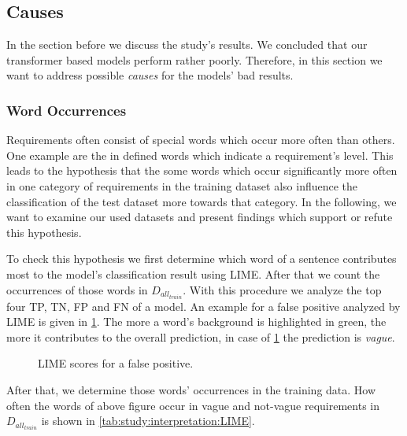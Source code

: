\subsection{Causes}
\label{chp:study:sec:interpretation:subsec:causes}
In the section before we discuss the study's results.
We concluded that our transformer based models perform rather poorly.
Therefore, in this section we want to address possible \textit{causes} for the models' bad results.

\subsubsection{Word Occurrences}
\label{chp:study:sec:interpretation:subsec:causes:word_occurrences}
Requirements often consist of special words which occur more often than others.
One example are the in \textcite{Bradner:1997} defined words which indicate a requirement's level.
This leads to the hypothesis that the some words which occur significantly more often in one category of requirements in the training dataset also influence the classification of the test dataset more towards that category.
In the following, we want to examine our used datasets and present findings which support or refute this hypothesis.

To check this hypothesis we first determine which word of a sentence contributes most to the model's classification result using \ac{LIME}.
After that we count the occurrences of those words in $D_{all_{train}}$.
With this procedure we analyze the top four \ac{TP}, \ac{TN}, \ac{FP} and \ac{FN} of a model.
An example for a false positive analyzed by \ac{LIME} is given in \cref{fig:study:interpretation:LIME}.
The more a word's background is highlighted in green, the more it contributes to the overall prediction, in case of \cref{fig:study:interpretation:LIME} the prediction is \textit{vague}.
\newpage %
\begin{figure}[htpb]
    \centering
    \def\svgwidth{\columnwidth}
    
    \caption[Study Interpretation: Example for LIME]{LIME scores for a false positive.}\label{fig:study:interpretation:LIME}
\end{figure}

After that, we determine those words' occurrences in the training data.
How often the words of above figure occur in vague and not-vague requirements in $D_{all_{train}}$ is shown in \cref{tab:study:interpretation:LIME}.

